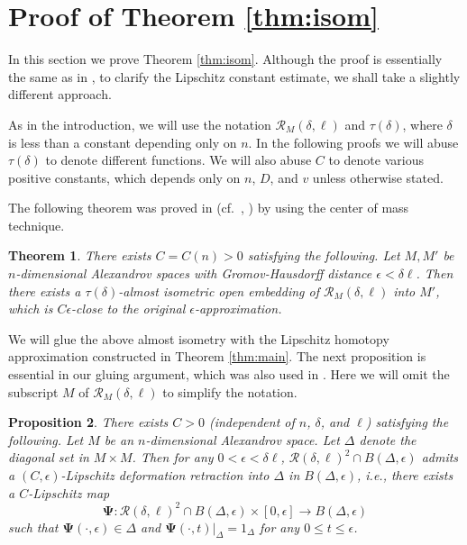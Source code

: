 \documentclass[a4paper,12pt]{amsart}
\theoremstyle{plain}
\newtheorem{thm}{Theorem}
\newtheorem{prop}[thm]{Proposition}
\theoremstyle{definition}
\numberwithin{thm}{section}
\numberwithin{equation}{section}
\begin{document}
\section{Proof of Theorem \ref{thm:isom}}\label{sec:isom}

In this section we prove Theorem \ref{thm:isom}.
Although the proof is essentially the same as in \cite[1.4]{MY:lip}, to clarify the Lipschitz constant estimate, we shall take a slightly different approach.

As in the introduction, we will use the notation $\mathcal R_M(\delta,\ell)$ and $\tau(\delta)$, where $\delta$ is less than a constant depending only on $n$.
In the following proofs we will abuse $\tau(\delta)$ to denote different functions.
We will also abuse $C$ to denote various positive constants, which depends only on $n$, $D$, and $v$ unless otherwise stated.

The following theorem was proved in \cite[9.8]{BGP} (cf.\ \cite{WSS}, \cite{Y:conv}) by using the center of mass technique.

\begin{thm}\label{thm:reg}
There exists $C=C(n)>0$ satisfying the following.
Let $M,M'$ be $n$-dimensional Alexandrov spaces with Gromov-Hausdorff distance $\epsilon<\delta\ell$.
Then there exists a $\tau(\delta)$-almost isometric open embedding of $\mathcal R_M(\delta,\ell)$ into $M'$, which is $C\epsilon$-close to the original $\epsilon$-approximation.
\end{thm}

We will glue the above almost isometry with the Lipschitz homotopy approximation constructed in Theorem \ref{thm:main}.
The next proposition is essential in our gluing argument, which was also used in \cite{MY:lip}.
Here we will omit the subscript $M$ of $\mathcal R_M(\delta,\ell)$ to simplify the notation.

\begin{prop}\label{prop:diag}
There exists $C>0$ (independent of $n$, $\delta$, and $\ell$) satisfying the following.
Let $M$ be an $n$-dimensional Alexandrov space.
Let $\Delta$ denote the diagonal set in $M\times M$.
Then for any $0<\epsilon<\delta\ell$, $\mathcal R(\delta,\ell)^2\cap B(\Delta,\epsilon)$ admits a $(C,\epsilon)$-Lipschitz deformation retraction into $\Delta$ in $B(\Delta,\epsilon)$, i.e., there exists a $C$-Lipschitz map\[\mathbf\Psi:\mathcal R(\delta,\ell)^2\cap B(\Delta,\epsilon)\times[0,\epsilon]\to B(\Delta,\epsilon)\]
such that $\mathbf\Psi(\cdot,\epsilon)\in\Delta$ and $\mathbf\Psi(\cdot,t)|_\Delta=1_\Delta$ for any $0\le t\le\epsilon$.
\end{prop}
\end{document}
